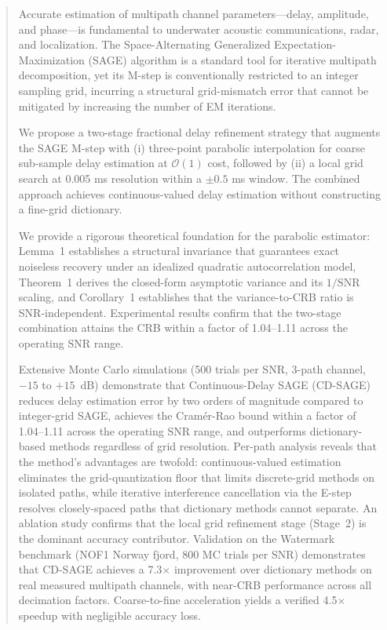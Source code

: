\documentclass[a4paper,fleqn]{cas-dc}
\newcommand{\bigO}{\mathcal{O}}
\begin{document}

\fntext[1]{}


\begin{abstract}
Accurate estimation of multipath channel parameters---delay, amplitude, and phase---is fundamental to underwater acoustic communications, radar, and localization. The Space-Alternating Generalized Expectation-Maximization (SAGE) algorithm is a standard tool for iterative multipath decomposition, yet its M-step is conventionally restricted to an integer sampling grid, incurring a structural grid-mismatch error that cannot be mitigated by increasing the number of EM iterations.

We propose a two-stage fractional delay refinement strategy that augments the SAGE M-step with (i) three-point parabolic interpolation for coarse sub-sample delay estimation at $\bigO(1)$ cost, followed by (ii) a local grid search at 0.005 ms resolution within a $\pm 0.5$ ms window. The combined approach achieves continuous-valued delay estimation without constructing a fine-grid dictionary.

We provide a rigorous theoretical foundation for the parabolic estimator: Lemma~1 establishes a structural invariance that guarantees exact noiseless recovery under an idealized quadratic autocorrelation model, Theorem~1 derives the closed-form asymptotic variance and its $1/\mathrm{SNR}$ scaling, and Corollary~1 establishes that the variance-to-CRB ratio is SNR-independent. Experimental results confirm that the two-stage combination attains the CRB within a factor of 1.04--1.11 across the operating SNR range.

Extensive Monte Carlo simulations (500 trials per SNR, 3-path channel, $-15$ to $+15$~dB) demonstrate that Continuous-Delay SAGE (CD-SAGE) reduces delay estimation error by two orders of magnitude compared to integer-grid SAGE, achieves the Cram\'{e}r-Rao bound within a factor of 1.04--1.11 across the operating SNR range, and outperforms dictionary-based methods regardless of grid resolution. Per-path analysis reveals that the method's advantages are twofold: continuous-valued estimation eliminates the grid-quantization floor that limits discrete-grid methods on isolated paths, while iterative interference cancellation via the E-step resolves closely-spaced paths that dictionary methods cannot separate. An ablation study confirms that the local grid refinement stage (Stage~2) is the dominant accuracy contributor. Validation on the Watermark benchmark (NOF1 Norway fjord, 800 MC trials per SNR) demonstrates that CD-SAGE achieves a 7.3$\times$ improvement over dictionary methods on real measured multipath channels, with near-CRB performance across all decimation factors. Coarse-to-fine acceleration yields a verified 4.5$\times$ speedup with negligible accuracy loss.
\end{abstract}
\end{document}
